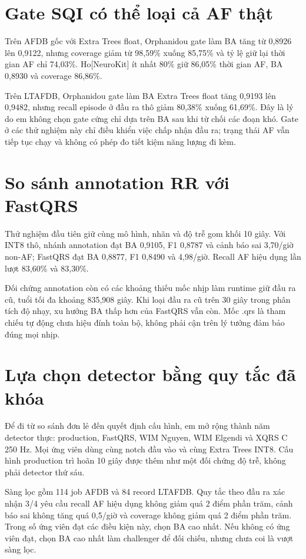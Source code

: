 \documentclass[12pt,a4paper,oneside]{report}
\begin{document}
\section{Gate SQI có thể loại cả AF thật}
Trên AFDB gốc với Extra Trees float, Orphanidou gate làm BA tăng từ 0,8926 lên 0,9122, nhưng coverage giảm từ 98,59\% xuống 85,75\% và tỷ lệ giữ lại thời gian AF chỉ 74,03\%. Ho[NeuroKit] ít nhất 80\% giữ 86,05\% thời gian AF, BA 0,8930 và coverage 86,86\%.

Trên LTAFDB, Orphanidou gate làm BA Extra Trees float tăng 0,9193 lên 0,9482, nhưng recall episode ở đầu ra thô giảm 80,38\% xuống 61,69\%. Đây là lý do em không chọn gate cứng chỉ dựa trên BA sau khi từ chối các đoạn khó. Gate ở các thử nghiệm này chỉ điều khiển việc chấp nhận đầu ra; trạng thái AF vẫn tiếp tục chạy và không có phép đo tiết kiệm năng lượng đi kèm.

\section{So sánh annotation RR với FastQRS}
Thử nghiệm đầu tiên giữ cùng mô hình, nhãn và độ trễ gom khối 10 giây. Với INT8 thô, nhánh annotation đạt BA 0,9105, F1 0,8787 và cảnh báo sai 3,70/giờ non-AF; FastQRS đạt BA 0,8877, F1 0,8490 và 4,98/giờ. Recall AF hiệu dụng lần lượt 83,60\% và 83,30\%.

Đối chứng annotation còn có các khoảng thiếu mốc nhịp làm runtime giữ đầu ra cũ, tuổi tối đa khoảng 835,908 giây. Khi loại đầu ra cũ trên 30 giây trong phân tích độ nhạy, xu hướng BA thấp hơn của FastQRS vẫn còn. Mốc .qrs là tham chiếu tự động chưa hiệu đính toàn bộ, không phải cận trên lý tưởng đảm bảo đúng mọi nhịp.

\section{Lựa chọn detector bằng quy tắc đã khóa}
Để đi từ so sánh đơn lẻ đến quyết định cấu hình, em mở rộng thành năm detector thực: production, FastQRS, WIM Nguyen, WIM Elgendi và XQRS C 250 Hz. Mọi ứng viên dùng cùng notch đầu vào và cùng Extra Trees INT8. Cấu hình production trì hoãn 10 giây được thêm như một đối chứng độ trễ, không phải detector thứ sáu.

Sàng lọc gồm 114 job AFDB và 84 record LTAFDB. Quy tắc theo đầu ra xác nhận 3/4 yêu cầu recall AF hiệu dụng không giảm quá 2 điểm phần trăm, cảnh báo sai không tăng quá 0,5/giờ và coverage không giảm quá 2 điểm phần trăm. Trong số ứng viên đạt các điều kiện này, chọn BA cao nhất. Nếu không có ứng viên đạt, chọn BA cao nhất làm challenger để đối chiếu, nhưng chưa coi là vượt sàng lọc.
\end{document}
